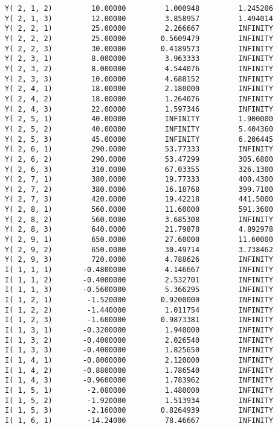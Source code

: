 \documentclass[12pt]{article}
\begin{document}
\begin{appendices}
\begin{lstlisting}
Y( 2, 1, 2)         10.00000         1.000948         1.245206
Y( 2, 1, 3)         12.00000         3.858957         1.494014
Y( 2, 2, 1)         25.00000         2.266667         INFINITY
Y( 2, 2, 2)         25.00000        0.5609479         INFINITY
Y( 2, 2, 3)         30.00000        0.4189573         INFINITY
Y( 2, 3, 1)         8.000000         3.963333         INFINITY
Y( 2, 3, 2)         8.000000         4.544076         INFINITY
Y( 2, 3, 3)         10.00000         4.688152         INFINITY
Y( 2, 4, 1)         18.00000         2.180000         INFINITY
Y( 2, 4, 2)         18.00000         1.264076         INFINITY
Y( 2, 4, 3)         22.00000         1.597346         INFINITY
Y( 2, 5, 1)         40.00000         INFINITY         1.900000
Y( 2, 5, 2)         40.00000         INFINITY         5.404360
Y( 2, 5, 3)         45.00000         INFINITY         6.206445
Y( 2, 6, 1)         290.0000         53.77333         INFINITY
Y( 2, 6, 2)         290.0000         53.47299         305.6800
Y( 2, 6, 3)         310.0000         67.03355         326.1300
Y( 2, 7, 1)         380.0000         19.77333         400.4300
Y( 2, 7, 2)         380.0000         16.18768         399.7100
Y( 2, 7, 3)         420.0000         19.42218         441.5000
Y( 2, 8, 1)         560.0000         11.60000         591.3600
Y( 2, 8, 2)         560.0000         3.685308         INFINITY
Y( 2, 8, 3)         640.0000         21.79878         4.892978
Y( 2, 9, 1)         650.0000         27.60000         11.60000
Y( 2, 9, 2)         650.0000         30.49714         3.738462
Y( 2, 9, 3)         720.0000         4.788626         INFINITY
I( 1, 1, 1)       -0.4800000         4.146667         INFINITY
I( 1, 1, 2)       -0.4000000         2.532701         INFINITY
I( 1, 1, 3)       -0.5600000         5.366295         INFINITY
I( 1, 2, 1)        -1.520000        0.9200000         INFINITY
I( 1, 2, 2)        -1.440000         1.011754         INFINITY
I( 1, 2, 3)        -1.600000        0.9873381         INFINITY
I( 1, 3, 1)       -0.3200000         1.940000         INFINITY
I( 1, 3, 2)       -0.4000000         2.026540         INFINITY
I( 1, 3, 3)       -0.4000000         1.825650         INFINITY
I( 1, 4, 1)       -0.8000000         2.120000         INFINITY
I( 1, 4, 2)       -0.8800000         1.786540         INFINITY
I( 1, 4, 3)       -0.9600000         1.783962         INFINITY
I( 1, 5, 1)        -2.080000         1.480000         INFINITY
I( 1, 5, 2)        -1.920000         1.513934         INFINITY
I( 1, 5, 3)        -2.160000        0.8264939         INFINITY
I( 1, 6, 1)        -14.24000         78.46667         INFINITY

\end{lstlisting}
\end{appendices}
\end{document}
